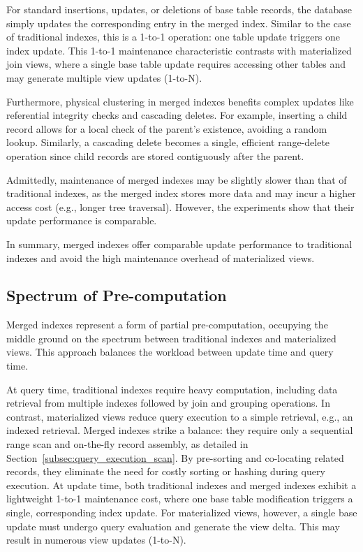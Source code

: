 \documentclass[sigconf, pdfa, nonacm]{acmart}
\begin{document}
For standard insertions, updates, or deletions of base table records, the database simply updates the corresponding entry in the merged index.
Similar to the case of traditional indexes, this is a 1-to-1 operation: one table update triggers one index update.
This 1-to-1 maintenance characteristic contrasts with materialized join views, where a single base table update requires accessing other tables and may generate multiple view updates (1-to-N).

Furthermore, physical clustering in merged indexes benefits complex updates like referential integrity checks and cascading deletes. For example, inserting a child record allows for a local check of the parent's existence, avoiding a random lookup. Similarly, a cascading delete becomes a single, efficient range-delete operation since child records are stored contiguously after the parent.

Admittedly, maintenance of merged indexes may be slightly slower than that of traditional indexes, as the merged index stores more data and may incur a higher access cost (e.g., longer tree traversal). However, the experiments show that their update performance is comparable.

In summary, merged indexes offer comparable update performance to traditional indexes and avoid the high maintenance overhead of materialized views.

\subsection{Spectrum of Pre-computation}\label{subsec:spec-precomp}

Merged indexes represent a form of partial pre-computation, occupying the middle ground on the spectrum between traditional indexes and materialized views. This approach balances the workload between update time and query time.

At query time, traditional indexes require heavy computation, including data retrieval from multiple indexes followed by join and grouping operations. In contrast, materialized views reduce query execution to a simple retrieval, e.g., an indexed retrieval. Merged indexes strike a balance: they require only a sequential range scan and on-the-fly record assembly, as detailed in Section~\ref{subsec:query_execution_scan}. By pre-sorting and co-locating related records, they eliminate the need for costly sorting or hashing during query execution.
At update time, both traditional indexes and merged indexes exhibit a lightweight 1-to-1 maintenance cost, where one base table modification triggers a single, corresponding index update. For materialized views, however, a single base update must undergo query evaluation and generate the view delta. This may result in numerous view updates (1-to-N).
\end{document}
